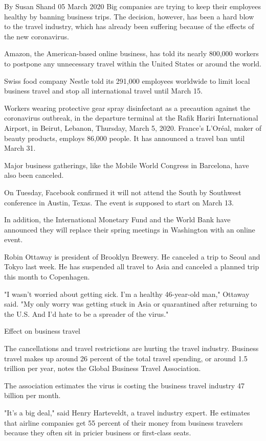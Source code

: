 By Susan Shand
05 March 2020
Big companies are trying to keep their employees healthy by banning business trips. The decision, however, has been a hard blow to the travel industry, which has already been suffering because of the effects of the new coronavirus.

Amazon, the American-based online business, has told its nearly 800,000 workers to postpone any unnecessary travel within the United States or around the world.

Swiss food company Nestle told its 291,000 employees worldwide to limit local business travel and stop all international travel until March 15.

Workers wearing protective gear spray disinfectant as a precaution against the coronavirus outbreak, in the departure terminal at the Rafik Hariri International Airport, in Beirut, Lebanon, Thursday, March 5, 2020.
France's L'Oréal, maker of beauty products, employs 86,000 people. It has announced a travel ban until March 31.

Major business gatherings, like the Mobile World Congress in Barcelona, have also been canceled.

On Tuesday, Facebook confirmed it will not attend the South by Southwest conference in Austin, Texas. The event is supposed to start on March 13.

In addition, the International Monetary Fund and the World Bank have announced they will replace their spring meetings in Washington with an online event.

Robin Ottaway is president of Brooklyn Brewery. He canceled a trip to Seoul and Tokyo last week. He has suspended all travel to Asia and canceled a planned trip this month to Copenhagen.

"I wasn't worried about getting sick. I'm a healthy 46-year-old man," Ottaway said. "My only worry was getting stuck in Asia or quarantined after returning to the U.S. And I'd hate to be a spreader of the virus."

Effect on business travel

The cancellations and travel restrictions are hurting the travel industry. Business travel makes up around 26 percent of the total travel spending, or around 1.5 trillion per year, notes the Global Business Travel Association.

The association estimates the virus is costing the business travel industry 47 billion per month.

"It's a big deal," said Henry Harteveldt, a travel industry expert. He estimates that airline companies get 55 percent of their money from business travelers because they often sit in pricier business or first-class seats.

